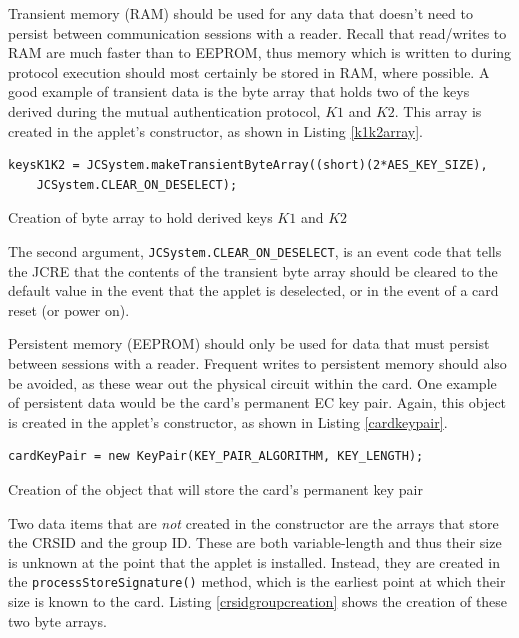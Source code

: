 \documentclass[12pt,a4paper,twoside,openright]{report}
\begin{document}
Transient memory (RAM) should be used for any data that doesn't need to persist between communication sessions with a reader. Recall that read/writes to RAM are much faster than to EEPROM, thus memory which is written to during protocol execution should most certainly be stored in RAM, where possible. A good example of transient data is the byte array that holds two of the keys derived during the mutual authentication protocol, $K1$ and $K2$. This array is created in the applet's constructor, as shown in Listing \autoref{k1k2array}.

\begin{listing}
\begin{verbatim}
keysK1K2 = JCSystem.makeTransientByteArray((short)(2*AES_KEY_SIZE),
    JCSystem.CLEAR_ON_DESELECT);
\end{verbatim}
\caption{Creation of byte array to hold derived keys $K1$ and $K2$}
\label{k1k2array}
\end{listing}

\noindent
The second argument, \texttt{JCSystem.CLEAR\_ON\_DESELECT}, is an event code that tells the JCRE that the contents of the transient byte array should be cleared to the default value in the event that the applet is deselected, or in the event of a card reset (or power on).

Persistent memory (EEPROM) should only be used for data that must persist between sessions with a reader. Frequent writes to persistent memory should also be avoided, as these wear out the physical circuit within the card. One example of persistent data would be the card's permanent EC key pair. Again, this object is created in the applet's constructor, as shown in Listing \autoref{cardkeypair}.

\begin{listing}
\begin{verbatim}
cardKeyPair = new KeyPair(KEY_PAIR_ALGORITHM, KEY_LENGTH);
\end{verbatim}
\caption{Creation of the object that will store the card's permanent key pair}
\label{cardkeypair}
\end{listing}

\noindent
Two data items that are \emph{not} created in the constructor are the arrays that store the CRSID and the group ID. These are both variable-length and thus their size is unknown at the point that the applet is installed. Instead, they are created in the \texttt{processStoreSignature()} method, which is the earliest point at which their size is known to the card. Listing \autoref{crsidgroupcreation} shows the creation of these two byte arrays.
\end{document}
